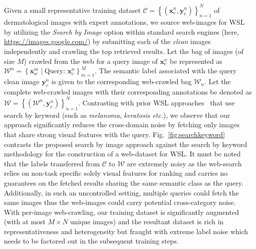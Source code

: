 \documentclass{llncs}
\begin{document}
\vspace{-10pt}
Given a small representative training dataset $\mathcal{C} = \left \{ \left ( \mathbf{x}_{c}^{n}, \mathbf{y}_{c}^{n} \right ) \right \}_{n=1}^{N}$ of dermatological images with expert annotations, we source web-images for WSL by utilizing the \textit{Search by Image} option within standard search engines (here, \url{https://images.google.com/}) by submitting each of the \textit{clean} images independently and crawling the top retrieved results. Let the bag of images (of size $M$) crawled from the web for a query image of $\mathbf{x}_{c}^{n}$ be represented as $\mathcal{W}^{n} = \left \{  \mathbf{x}_{w}^{m} \mid \text{Query: }\mathbf{x}^{n}_{c} \right \}_{m=1}^{M}$. The semantic label associated with the query clean image $\mathbf{y}_{c}^{n}$ is given to the corresponding web-crawled bag $\mathcal{W}_{n}$. Let the complete web-crawled images with their corresponding annotations be denoted as $\mathcal{W} = \left \{ \left ( \mathcal{W}^{n}, \mathbf{y}_{c}^{n} \right ) \right \}_{n=1}^{N}$. Contrasting with prior WSL approaches~\cite{webly1,webly2} that use search by keyword (such as \textit{melanoma}, \textit{keratosis} \textit{etc.}), we observe that our approach significantly reduces the cross-domain noise by fetching only images that share strong visual features with the query. Fig.~\ref{fig:searchkeyword} contrasts the proposed search by image approach against the search by keyword methodology for the construction of a web-dataset for WSL. It must be noted that the labels transferred from $\mathcal{C}$ to $\mathcal{W}$ are extremely noisy as the web-search relies on non-task specific solely visual features for ranking and carries no guarantees on the fetched results sharing the same semantic class as the query. Additionally, in such an uncontrolled setting, multiple queries could fetch the same images thus the web-images could carry potential cross-category noise. With per-image web-crawling, our training dataset is significantly augmented (with at most $M \times N$ unique images) and the resultant dataset is rich in representativeness and heterogeneity but fraught with extreme label noise which needs to be factored out in the subsequent training steps.  
\end{document}
